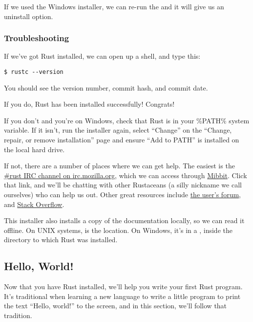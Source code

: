 If we used the Windows installer, we can re-run the  and it will give us an uninstall option.

\subsubsection*{Troubleshooting}

If we've got Rust installed, we can open up a shell, and type this:

\begin{verbatim}
$ rustc --version
\end{verbatim}

You should see the version number, commit hash, and commit date.

\blank

If you do, Rust has been installed successfully! Congrats!

\blank

If you don't and you're on Windows, check that Rust is in your \%PATH\% system variable. If it isn't, run the installer again, 
select \enquote{Change} on the \enquote{Change, repair, or remove installation} page and ensure \enquote{Add to PATH} is installed 
on the local hard drive.

\blank

If not, there are a number of places where we can get help. The easiest is the 
\href{irc://irc.mozilla.org/\#rust}{\#rust IRC channel on irc.mozilla.org}, which we can access through
\href{http://chat.mibbit.com/?server=irc.mozilla.org&channel=\%23rust}{Mibbit}. Click that link, and we'll be chatting with other 
Rustaceans (a silly nickname we call ourselves) who can help us out. Other great resources include 
\href{https://users.rust-lang.org/}{the user's forum}, and \href{http://stackoverflow.com/questions/tagged/rust}{Stack Overflow}.

\blank

This installer also installs a copy of the documentation locally, so we can read it offline. On UNIX systems,  
is the location. On Windows, it's in a , inside the directory to which Rust was installed.

\subsection{Hello, World!}

Now that you have Rust installed, we'll help you write your first Rust program. It's traditional when learning a new language 
to write a little program to print the text \enquote{Hello, world!} to the screen, and in this section, we'll follow that 
tradition.

